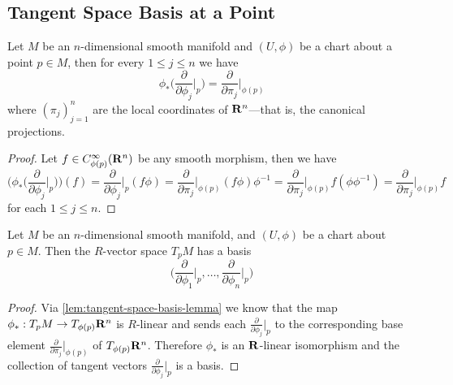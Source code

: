 \subsection{Tangent Space Basis at a Point}

\begin{lemma}
    \label{lem:tangent-space-basis-lemma}
    Let \(M\) be an \(n\)-dimensional smooth manifold and \((U, \phi)\) be a chart
    about a point \(p \in M\), then for every \(1 \leq j \leq n\) we have
    \[
        \phi_{*}\Big( \frac{\partial}{\partial \phi_j}\Big|_p \Big)
        = \frac{\partial}{\partial \pi_j} \Big|_{\phi(p)}
    \]
    where \((\pi_j)_{j=1}^n\) are the local coordinates of \(\mathbf{R}^n\)---that is, the
    canonical projections.
\end{lemma}

\begin{proof}
    Let \(f \in C_{\phi(p)}^{\infty}(\mathbf{R}^n)\) be any smooth morphism, then we have
    \[
        \Big( \phi_{*} \Big( \frac{\partial}{\partial \phi_j} \Big|_p \Big) \Big) (f)
        = \frac{\partial}{\partial \phi_j}\Big|_p (f \phi)
        = \frac{\partial}{\partial \pi_j}\Big|_{\phi(p)} (f \phi) \phi^{-1}
        = \frac{\partial}{\partial \pi_j}\Big|_{\phi(p)} f (\phi \phi^{-1})
        = \frac{\partial}{\partial \pi_j}\Big|_{\phi(p)} f
    \]
    for each \(1 \leq j \leq n\).
\end{proof}

\begin{proposition}
    \label{prop:tangent-space-basis}
    Let \(M\) be an \(n\)-dimensional smooth manifold, and \((U, \phi)\) be a chart
    about \(p \in M\). Then the \(R\)-vector space \(T_p M\) has a basis
    \[
        \Big( \frac{\partial}{\partial \phi_1}\Big|_p, \dots,
        \frac{\partial}{\partial \phi_n}\Big|_p \Big)
    \]
\end{proposition}

\begin{proof}
    Via \cref{lem:tangent-space-basis-lemma} we know that the map
    \(\phi_{*}: T_p M \to T_{\phi(p)} \mathbf{R}^n\) is \(R\)-linear and sends each
    \(\frac{\partial}{\partial \phi_j}\big|_p\) to the corresponding base element
    \(\frac{\partial}{\partial \pi_j}\big|_{\phi(p)}\) of \(T_{\phi(p)}
    \mathbf{R}^n\). Therefore \(\phi_{*}\) is an \(\mathbf{R}\)-linear isomorphism and the
    collection of tangent vectors \(\frac{\partial}{\partial \phi_j}\big|_p\) is a
    basis.
\end{proof}

